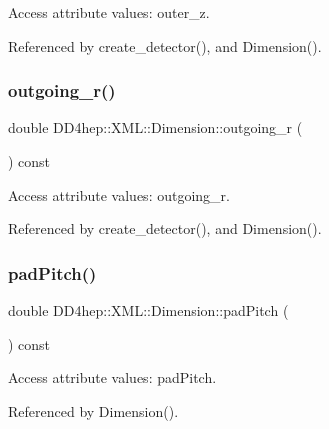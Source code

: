 Access attribute values\+: outer\+\_\+z. 



Referenced by create\+\_\+detector(), and Dimension().

\hypertarget{struct_d_d4hep_1_1_x_m_l_1_1_dimension_a413da316c1791a2eb69234bb7215d731}{}\label{struct_d_d4hep_1_1_x_m_l_1_1_dimension_a413da316c1791a2eb69234bb7215d731} 
\subsubsection{\texorpdfstring{outgoing\+\_\+r()}{outgoing\_r()}}
{\footnotesize\ttfamily double D\+D4hep\+::\+X\+M\+L\+::\+Dimension\+::outgoing\+\_\+r (\begin{DoxyParamCaption}{ }\end{DoxyParamCaption}) const}



Access attribute values\+: outgoing\+\_\+r. 



Referenced by create\+\_\+detector(), and Dimension().

\hypertarget{struct_d_d4hep_1_1_x_m_l_1_1_dimension_aa235941c309f7e4256de9278ed8e4310}{}\label{struct_d_d4hep_1_1_x_m_l_1_1_dimension_aa235941c309f7e4256de9278ed8e4310} 
\subsubsection{\texorpdfstring{pad\+Pitch()}{padPitch()}}
{\footnotesize\ttfamily double D\+D4hep\+::\+X\+M\+L\+::\+Dimension\+::pad\+Pitch (\begin{DoxyParamCaption}{ }\end{DoxyParamCaption}) const}



Access attribute values\+: pad\+Pitch. 



Referenced by Dimension().

\hypertarget{struct_d_d4hep_1_1_x_m_l_1_1_dimension_a2fe45821279a8240b345cc27033dc920}{}\label{struct_d_d4hep_1_1_x_m_l_1_1_dimension_a2fe45821279a8240b345cc27033dc920} 
